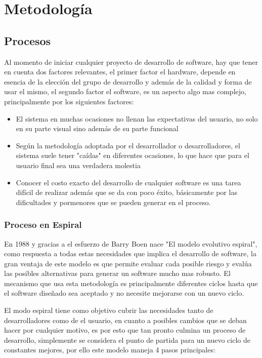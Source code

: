 \chapter{Metodología}

\section{Procesos}
Al momento de iniciar cualquier proyecto de desarrollo de software, hay que tener en cuenta dos factores relevantes, el primer factor el hardware, depende en esencia de la elección del grupo de desarrollo y además de la calidad y forma de usar el mismo, el segundo factor el software, es un aspecto algo mas complejo, principalmente por los siguientes factores:
\begin{itemize}
	\item El sistema en muchas ocasiones no llenan las expectativas del usuario, no solo en su parte visual sino además de su parte funcional
	\item Según la metodología adoptada por el desarrollador o desarrolladores, el sistema suele tener "caídas" en diferentes ocasiones, lo que hace que para el usuario final sea una verdadera molestia
	\item Conocer el costo exacto del desarrollo de cualquier software es una tarea difícil de realizar además que se da con poco éxito, básicamente por las dificultades y pormenores que se pueden generar en el proceso.
	
\end{itemize}
\subsection{Proceso en Espiral}
En 1988 y gracias a el esfuerzo de Barry Boen nace "El modelo evolutivo espiral", como respuesta a todas estas necesidades que implica el desarrollo de software, la gran ventaja de este modelo es que permite evaluar cada posible riesgo y evalúa las posibles alternativas para generar un software mucho mas robusto. El mecanismo que usa esta metodología es principalmente diferentes ciclos hasta que el software diseñado sea aceptado y no necesite mejorarse con un nuevo ciclo.

El modo espiral tiene como objetivo cubrir las necesidades tanto de desarrolladores como de el usuario, en cuanto a posibles cambios que se deban hacer por cualquier motivo, es por esto que tan pronto culmina un proceso de desarrollo, simplemente se considera el punto de partida para un nuevo ciclo de constantes mejores, por ello este modelo maneja 4 pasos principales:

